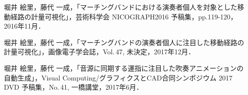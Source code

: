 \renewcommand{\refname}{公開文献}	
%
\begin{thebibliography}{55}
%
堀井 絵里，藤代 一成，「マーチングバンドにおける演奏者個人を対象とした移動経路の計量可視化」，芸術科学会 NICOGRAPH2016 予稿集，pp.119-120，2016年11月．

堀井 絵里，藤代 一成，「マーチングバンドの演奏者個人に注目した移動経路の計量可視化」，画像電子学会誌，Vol.\,47, 未決定，2017年12月．

堀井 絵里，藤代 一成，「音源に同期する運指に注目した吹奏アニメーションの自動生成」，Visual Computing/グラフィクスとCAD合同シンポジウム 2017 DVD 予稿集，No.\,41, 一橋講堂，2017年6月．

\end{thebibliography}